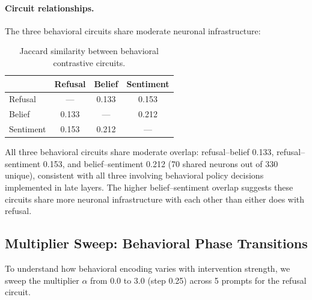 \documentclass[11pt]{article}
\begin{document}
\paragraph{Circuit relationships.}
The three behavioral circuits share moderate neuronal infrastructure:

\begin{table}[h]
\centering
\caption{Jaccard similarity between behavioral contrastive circuits.}
\label{tab:behavioral_overlap}
\small
\begin{tabular}{lccc}
\toprule
& \textbf{Refusal} & \textbf{Belief} & \textbf{Sentiment} \\
\midrule
Refusal & --- & 0.133 & 0.153 \\
Belief & 0.133 & --- & 0.212 \\
Sentiment & 0.153 & 0.212 & --- \\
\bottomrule
\end{tabular}
\end{table}

All three behavioral circuits share moderate overlap: refusal--belief 0.133, refusal--sentiment 0.153, and belief--sentiment 0.212 (70 shared neurons out of 330 unique), consistent with all three involving behavioral policy decisions implemented in late layers.
The higher belief--sentiment overlap suggests these circuits share more neuronal infrastructure with each other than either does with refusal.

\subsection{Multiplier Sweep: Behavioral Phase Transitions}
\label{sec:sweep}

To understand how behavioral encoding varies with intervention strength, we sweep the multiplier $\alpha$ from 0.0 to 3.0 (step 0.25) across 5 prompts for the refusal circuit.
\end{document}
